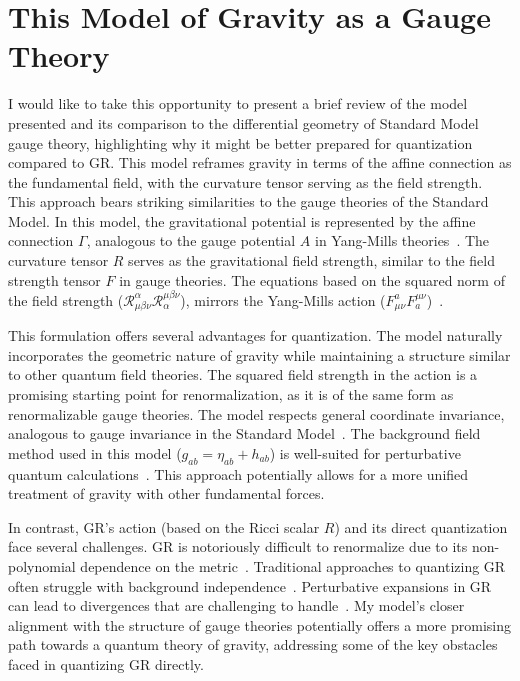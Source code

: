 \documentclass[aps,prd,preprint]{revtex4-1}
\begin{document}
\section{This Model of Gravity as a Gauge Theory}
I would like to take this opportunity to present a brief review of the model presented and its comparison to the differential geometry of Standard Model gauge theory, highlighting why it might be better prepared for quantization compared to GR. This model reframes gravity in terms of the affine connection as the fundamental field, with the curvature tensor serving as the field strength. This approach bears striking similarities to the gauge theories of the Standard Model. In this model, the gravitational potential is represented by the affine connection $\Gamma$, analogous to the gauge potential $A$ in Yang-Mills theories~\cite{peskin_1995,hauser_2019_1,hauser_2019_2,hauser_2019_3}. The curvature tensor $R$ serves as the gravitational field strength, similar to the field strength tensor $F$ in gauge theories. The equations based on the squared norm of the field strength ($\mathcal{R}^\alpha_{\mu\beta\nu}\mathcal{R}_\alpha^{\mu\beta\nu}$), mirrors the Yang-Mills action ($F^{a}_{\mu\nu} F_{a}^{\mu\nu}$)~\cite{peskin_1995}.

This formulation offers several advantages for quantization. The model naturally incorporates the geometric nature of gravity while maintaining a structure similar to other quantum field theories. The squared field strength in the action is a promising starting point for renormalization, as it is of the same form as renormalizable gauge theories. The model respects general coordinate invariance, analogous to gauge invariance in the Standard Model~\cite{hauser_2019_1,hauser_2019_2,hauser_2019_3}. The background field method used in this model ($g_{ab} = \eta_{ab} + h_{ab}$) is well-suited for perturbative quantum calculations~\cite{bern_2002}. This approach potentially allows for a more unified treatment of gravity with other fundamental forces.

In contrast, GR's action (based on the Ricci scalar $R$) and its direct quantization face several challenges. GR is notoriously difficult to renormalize due to its non-polynomial dependence on the metric~\cite{deser_2009}. Traditional approaches to quantizing GR often struggle with background independence~\cite{reuter_2009,ashtekar_2009,ashtekar_2004,read_2023}. Perturbative expansions in GR can lead to divergences that are challenging to handle~\cite{deser_1957}. My model's closer alignment with the structure of gauge theories potentially offers a more promising path towards a quantum theory of gravity, addressing some of the key obstacles faced in quantizing GR directly.
\end{document}
